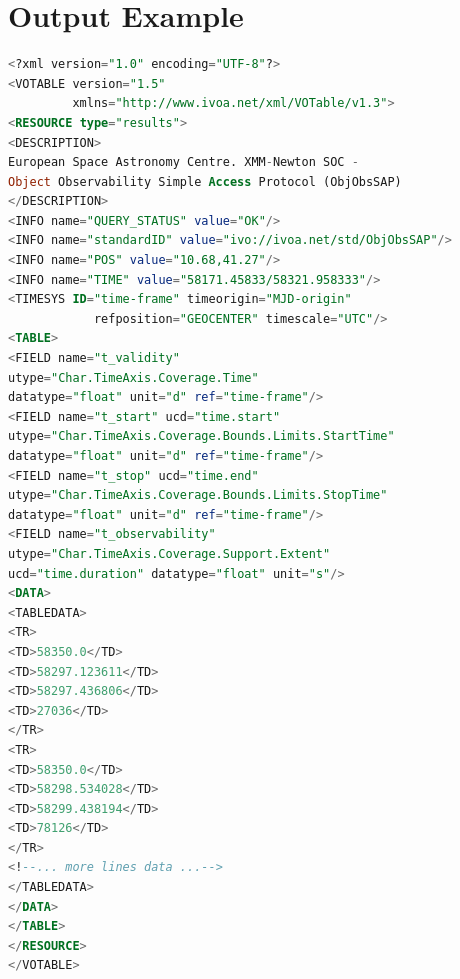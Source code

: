 \documentclass[11pt,a4paper]{ivoatex/ivoa}
\begin{document}
\section{Output Example}
\begin{lstlisting}[language=SQL]
<?xml version="1.0" encoding="UTF-8"?>
<VOTABLE version="1.5"
         xmlns="http://www.ivoa.net/xml/VOTable/v1.3">
<RESOURCE type="results">
<DESCRIPTION>
European Space Astronomy Centre. XMM-Newton SOC -
Object Observability Simple Access Protocol (ObjObsSAP)
</DESCRIPTION>
<INFO name="QUERY_STATUS" value="OK"/>
<INFO name="standardID" value="ivo://ivoa.net/std/ObjObsSAP"/>
<INFO name="POS" value="10.68,41.27"/>
<INFO name="TIME" value="58171.45833/58321.958333"/>
<TIMESYS ID="time-frame" timeorigin="MJD-origin"
            refposition="GEOCENTER" timescale="UTC"/>
<TABLE>
<FIELD name="t_validity"
utype="Char.TimeAxis.Coverage.Time"
datatype="float" unit="d" ref="time-frame"/>
<FIELD name="t_start" ucd="time.start"
utype="Char.TimeAxis.Coverage.Bounds.Limits.StartTime"
datatype="float" unit="d" ref="time-frame"/>
<FIELD name="t_stop" ucd="time.end"
utype="Char.TimeAxis.Coverage.Bounds.Limits.StopTime"
datatype="float" unit="d" ref="time-frame"/>
<FIELD name="t_observability"
utype="Char.TimeAxis.Coverage.Support.Extent"
ucd="time.duration" datatype="float" unit="s"/>
<DATA>
<TABLEDATA>
<TR>
<TD>58350.0</TD>
<TD>58297.123611</TD>
<TD>58297.436806</TD>
<TD>27036</TD>
</TR>
<TR>
<TD>58350.0</TD>
<TD>58298.534028</TD>
<TD>58299.438194</TD>
<TD>78126</TD>
</TR>
<!--... more lines data ...--> 
</TABLEDATA>
</DATA>
</TABLE>
</RESOURCE>
</VOTABLE>
\end{lstlisting}

\appendix
\renewcommand{\thesection}{\Alph{section}.\arabic{section}}
\setcounter{section}{0}
\end{document}
